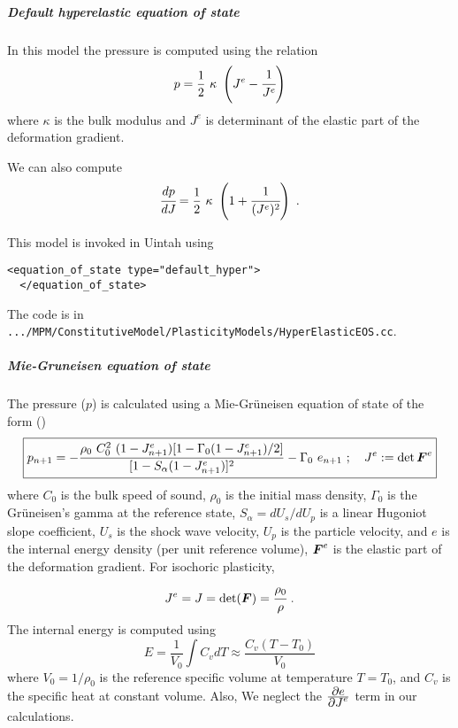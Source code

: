 \subparagraph{Default hyperelastic equation of state}
In this model the pressure is computed using the relation
\begin{equation}
  p = \Half~\kappa~\left(J^e - \cfrac{1}{J^e}\right)
\end{equation}
where $\kappa$ is the bulk modulus and $J^e$ is determinant of the elastic
part of the deformation gradient.

We can also compute
\begin{equation}
  \Deriv{p}{J} = \Half~\kappa~\left(1 + \cfrac{1}{(J^e)^2}\right) ~.
\end{equation}

This model is invoked in Uintah using
\begin{Verbatim}[fontsize=\footnotesize]
  <equation_of_state type="default_hyper">
  </equation_of_state>
\end{Verbatim}
The code is in \verb|.../MPM/ConstitutiveModel/PlasticityModels/HyperElasticEOS.cc|.

\subparagraph{Mie-Gruneisen equation of state}
The pressure ($p$) is calculated using a Mie-Gr{\"u}neisen equation of state
of the form (\cite{Wilkins99,Zocher00})
\begin{equation} \label{eq:EOSMG_upd}
  \boxed{
  p_{n+1} =  - \frac{\rho_0~C_0^2~(1 - J^e_{n+1})
           [1 - \Gamma_0 (1 - J^e_{n+1})/2]}
           {[1 - S_{\alpha}(1 - J^e_{n+1})]^2} - \Gamma_0~e_{n+1} 
  ~;~~~ J^e := \det{\BF^e} 
  }
\end{equation}
where $C_0$ is the bulk speed of sound, $\rho_0$ is the initial mass density,
$\Gamma_0$ is the Gr{\"u}neisen's gamma at the reference state,
$S_{\alpha} = dU_s/dU_p$ is a linear Hugoniot slope coefficient,
$U_s$ is the shock wave velocity, $U_p$ is the particle velocity, and
$e$ is the internal energy density (per unit reference volume), $\BF^e$ is
the elastic part of the deformation gradient.  For isochoric plasticity,
\begin{equation*}
  J^e = J = \det(\BF) = \cfrac{\rho_0}{\rho} ~.
\end{equation*}
  The internal energy is computed using
  \begin{equation}
    E = \frac{1}{V_0} \int C_v dT \approx \frac{C_v (T-T_0)}{V_0}
  \end{equation}
  where $V_0 = 1/\rho_0$ is the reference specific volume at temperature
  $T = T_0$, and $C_v$ is the specific heat at constant volume.
Also,
\Beq
\Eeq
We neglect the $\Partial{e}{J^e}$ term in our calculations.


